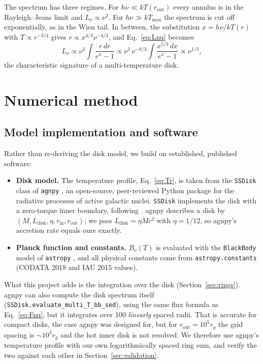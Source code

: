 \documentclass[11pt,a4paper]{article}
\newcommand{\Mdot}{\dot M}
\newcommand{\rin}{r_{\mathrm{in}}}
\newcommand{\rout}{r_{\mathrm{out}}}
\newcommand{\Tmax}{T_{\max}}
\newcommand{\rg}{r_{g}}
\begin{document}
The spectrum has three regimes. For $h\nu\ll kT(\rout)$ every annulus is in
the Rayleigh--Jeans limit and $L_\nu\propto\nu^2$. For $h\nu\gg k\Tmax$ the
spectrum is cut off exponentially, as in the Wien tail. In between, the
substitution $x=h\nu/kT(r)$ with $T\propto r^{-3/4}$ gives
$r\propto x^{4/3}\nu^{-4/3}$, and Eq.~\eqref{eq:Lnu} becomes
\begin{equation}
  L_\nu\propto\nu^3\int\frac{r\,dr}{e^x-1}\propto\nu^3\,\nu^{-8/3}\int\frac{x^{5/3}\,dx}{e^x-1}\propto\nu^{1/3},
\end{equation}
the characteristic signature of a multi-temperature disk.

\section{Numerical method}\label{sec:method}

\subsection{Model implementation and software}\label{sec:software}
Rather than re-deriving the disk model, we build on established, published
software:
\begin{itemize}
  \item \textbf{Disk model.} The temperature profile, Eq.~\eqref{eq:Tr}, is
        taken from the \texttt{SSDisk} class of \texttt{agnpy}
        \citep{Nigro2022}, an open-source, peer-reviewed Python package for
        the radiative processes of active galactic nuclei. \texttt{SSDisk}
        implements the \citet{ShakuraSunyaev1973} disk with a zero-torque
        inner boundary, following \citet{DermerMenon2009}. agnpy describes a
        disk by $(M, L_{\mathrm{disk}}, \eta, \rin, \rout)$; we pass
        $L_{\mathrm{disk}}=\eta\Mdot c^2$ with $\eta=1/12$, so agnpy's
        accretion rate equals ours exactly.
  \item \textbf{Planck function and constants.} $B_\nu(T)$ is evaluated
        with the \texttt{BlackBody} model of \texttt{astropy}
        \citep{Astropy2022}, and all physical constants come from
        \texttt{astropy.constants} (CODATA 2018 and IAU 2015 values).
\end{itemize}
What this project adds is the integration over the disk
(Section~\ref{sec:rings}). agnpy can also compute the disk spectrum itself
(\texttt{SSDisk.evaluate\_multi\_T\_bb\_sed}), using the same flux formula as
Eq.~\eqref{eq:Fnu}, but it integrates over 100 \emph{linearly} spaced radii.
That is accurate for compact disks, the case agnpy was designed for, but for
$\rout=10^5\rg$ the grid spacing is $\sim10^3\rg$ and the hot inner disk is
not resolved. We therefore use agnpy's temperature profile with our own
logarithmically spaced ring sum, and verify the two against each other in
Section~\ref{sec:validation}.
\end{document}
